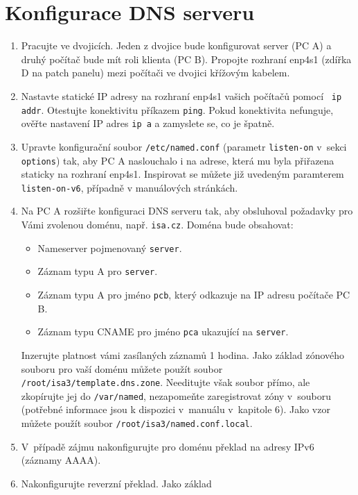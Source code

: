 \section{Konfigurace DNS serveru}
\begin{enumerate}

  \item Pracujte ve dvojicích. Jeden z dvojice bude konfigurovat server (PC A)
    a druhý počítač bude mít roli klienta (PC B). Propojte rozhraní enp4s1 (zdířka
    D na patch panelu) mezi počítači ve dvojici křížovým kabelem.
  \item Nastavte statické IP adresy na rozhraní enp4s1 vašich počítačů pomocí {\tt 
    ip addr}. Otestujte konektivitu příkazem {\tt ping}. Pokud konektivita nefunguje,
    ověřte nastavení IP adres {\tt ip a} a zamyslete se, co je špatně.
  \item Upravte konfigurační soubor {\tt /etc/named.conf} (parametr
    {\tt listen-on} v~sekci {\tt options}) tak, aby
    PC A naslouchalo i na adrese, která mu byla přiřazena staticky na rozhraní enp4s1.
    Inspirovat se můžete již uvedeným paramterem {\tt listen-on-v6}, případně v
    manuálových stránkách.
  \item Na PC A rozšiřte konfiguraci DNS serveru tak, aby obsluhoval požadavky pro Vámi
    zvolenou doménu, např. {\tt isa.cz}. Doména bude obsahovat:
    \begin{itemize}
      \item Nameserver pojmenovaný {\tt server}.
      \item Záznam typu A pro {\tt server}.
      \item Záznam typu A pro jméno {\tt pcb}, který odkazuje na IP adresu
        počítače PC B.
      \item Záznam typu CNAME pro jméno {\tt pca} ukazující na {\tt server}.
    \end{itemize}
    Inzerujte platnost vámi zasílaných záznamů 1 hodina.
    Jako základ zónového souboru pro vaší doménu můžete použít soubor 
    {\tt /root/isa3/template.dns.zone}.
    Needitujte však soubor přímo, ale zkopírujte jej do {\tt /var/named}, 
    nezapomeňte zaregistrovat zóny v~souboru  
    (potřebné informace jsou k dispozici v~manuálu v~kapitole 6). Jako vzor můžete 
    použít soubor {\tt /root/isa3/named.conf.local}.
  \item V~případě zájmu nakonfigurujte pro doménu překlad na adresy IPv6
    (záznamy AAAA).
  \item Nakonfigurujte reverzní překlad. Jako základ

\end{enumerate}
